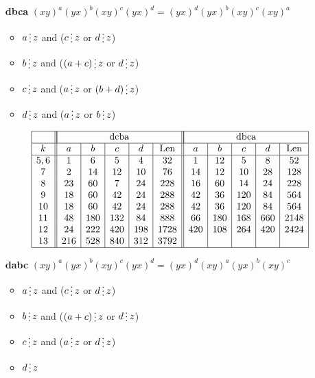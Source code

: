\documentclass[utf8]{article}
\newcommand{\divisibleby}{\mathop{\raisebox{-2pt}{\vdots}}}
\begin{document}
	\begin{itemize}		
		\item[\textbf{dbca}] $(xy)^a(yx)^b(xy)^c(yx)^d = (yx)^d(yx)^b(xy)^c(xy)^a$
		\begin{itemize}
			\item $a \divisibleby z$ and ($c \divisibleby z$ or $d \divisibleby z$)
			\item  $b \divisibleby z$ and ($(a+c) \divisibleby z$ or $d \divisibleby z$)
			\item $c \divisibleby z$ and ($a \divisibleby z$ or $(b+d) \divisibleby z$)
			\item $d \divisibleby z$ and ($a \divisibleby z$ or $b \divisibleby z$)
		\end{itemize}
		
		\begin{table}[!htb]
			\arraycolsep=2pt
			$$
			\begin{array}{|c||c|c|c|c|c||c|c|c|c|c|}
			\hline
			&\multicolumn{5}{|c||}{\text{dcba}}&\multicolumn{5}{|c|}{\text{dbca}}\\
			\hline
			k&a&b&c&d&\text{Len}&a&b&c&d&\text{Len}\\
			\hline
			5,6&1&6&5&4&32&1&12&5&8&52\\
			7&2&14&12&10&76&14&12&10&28&128\\
			8&23&60&7&24&228&16&60&14&24&228\\
			9&18&60&42&24&288&42&36&120&84&564\\
			10&18&60&42&24&288&42&36&120&84&564\\
			11&48&180&132&84&888&66&180&168&660&2148\\
			12&24&222&420&198&1728&420&108&264&420&2424\\
			13&216&528&840&312&3792&&&&&\\
			\hline
			\end{array}
			$$
		\end{table}
		
		\item[\textbf{dabc}] $(xy)^a(yx)^b(xy)^c(yx)^d = (yx)^d(xy)^a(yx)^b(xy)^c$
		\begin{itemize}
			\item $a \divisibleby z$ and ($c \divisibleby z$ or $d \divisibleby z$)
			\item  $b \divisibleby z$ and ($(a+c) \divisibleby z$ or $d \divisibleby z$)
			\item $c \divisibleby z$ and ($a \divisibleby z$ or $d \divisibleby z$)
			\item $d \divisibleby z$
		\end{itemize}
		

\end{itemize}
\end{document}

